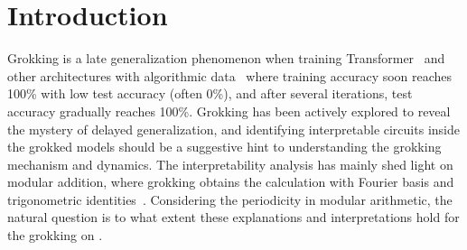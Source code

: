 \documentclass[10pt]{article} %
\newcommand{\update}[1]{{\color{black}{#1}}}
\begin{document}
\begin{abstract}
\end{abstract}

\section{Introduction}
Grokking is a late generalization phenomenon when training Transformer~\citep{vaswani2023attention} and other architectures with algorithmic data~\citep{power2022grokking} where training accuracy soon reaches 100\% with low test accuracy (often 0\%), and after several iterations, test accuracy gradually reaches 100\%.
Grokking has been actively explored to reveal the mystery of delayed generalization, and identifying interpretable circuits inside the grokked models should be a suggestive hint to understanding the grokking mechanism and dynamics.
The interpretability analysis has mainly shed light on modular addition, where grokking obtains the calculation with Fourier basis and trigonometric identities~\citep{nanda2023progress,zhong2023the,gromov2023grokking,rubin2023droplets}.
Considering the periodicity in modular arithmetic, the natural question is to what extent these explanations and interpretations hold for the grokking on \update{other modular operations beyond addition}.
\end{document}

